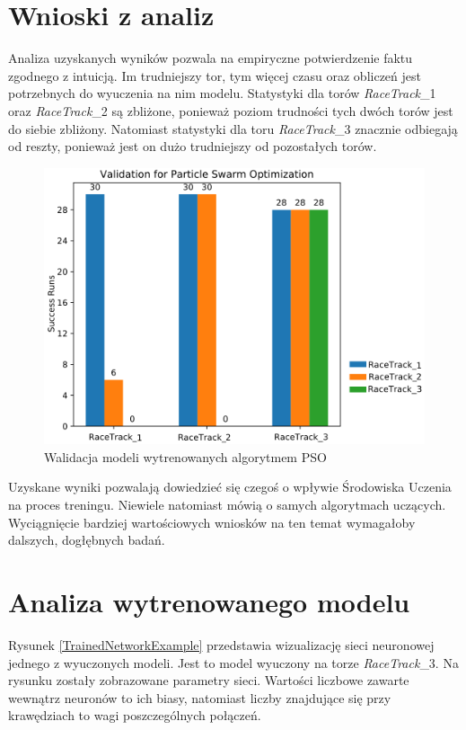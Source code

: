 \section{Wnioski z analiz}
Analiza uzyskanych wyników pozwala na empiryczne potwierdzenie faktu zgodnego z intuicją. Im trudniejszy tor, tym więcej czasu oraz obliczeń jest potrzebnych do wyuczenia na nim modelu. Statystyki dla torów \textit{RaceTrack}\_1 oraz \textit{RaceTrack}\_2 są zbliżone, ponieważ poziom trudności tych dwóch torów jest do siebie zbliżony. Natomiast statystyki dla toru \textit{RaceTrack}\_3 znacznie odbiegają od reszty, ponieważ jest on dużo trudniejszy od pozostałych torów.

\vspace{0.5cm}
\begin{figure}[H]
\centering
\includegraphics[width=15cm]{resources/figures/validation_pso.png}
\caption{Walidacja modeli wytrenowanych algorytmem PSO}
\label{ValidationPSO}
\end{figure}

Uzyskane wyniki pozwalają dowiedzieć się czegoś o wpływie Środowiska Uczenia na proces treningu. Niewiele natomiast mówią o samych algorytmach uczących. Wyciągnięcie bardziej wartościowych wniosków na ten temat wymagałoby dalszych, dogłębnych badań.

\section{Analiza wytrenowanego modelu}
Rysunek \ref{TrainedNetworkExample} przedstawia wizualizację sieci neuronowej jednego z wyuczonych modeli. Jest to model wyuczony na torze \textit{RaceTrack}\_3. Na rysunku zostały zobrazowane parametry sieci. Wartości liczbowe zawarte wewnątrz neuronów to ich biasy, natomiast liczby znajdujące się przy krawędziach to wagi poszczególnych połączeń.

